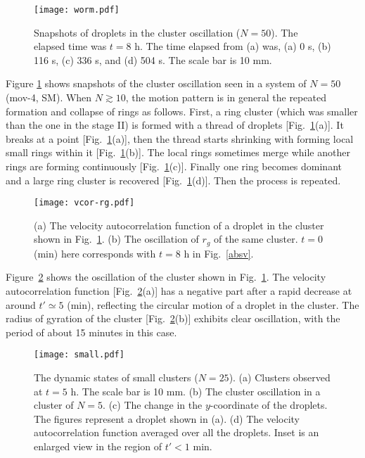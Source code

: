 \documentclass[showpacs]{revtex4-1}
\begin{document}
\begin{figure}
 \begin{center}
 \texttt{[image: worm.pdf]} \caption{Snapshots of
 droplets in the cluster oscillation ($N=50$). The elapsed time was
 $t=8$ h. The time elapsed from (a) was, (a) 0 s, (b) 116 s, (c) 336 s,
 and (d) 504 s. The scale bar is 10 mm.} \label{worm}  
 \end{center}
\end{figure}

Figure \ref{worm} shows snapshots of the cluster oscillation seen in a
system of $N=50$ (mov-4, SM). When $N\gtrsim 10$, the motion pattern
is in general the repeated formation and collapse of rings as
follows. First, a ring cluster (which was smaller than the one in the
stage II) is formed with a thread of droplets [Fig.~\ref{worm}(a)]. It
breaks at a point [Fig.~\ref{worm}(a)], then the thread starts shrinking
with forming local small rings within it [Fig.~\ref{worm}(b)]. The local
rings sometimes merge while another rings are forming continuously
[Fig.~\ref{worm}(c)]. Finally one ring becomes dominant and a
large ring cluster is recovered [Fig.~\ref{worm}(d)]. Then the
process is repeated.

\begin{figure}
 \begin{center}
 \texttt{[image: vcor-rg.pdf]} \caption{(a)
 The velocity autocorrelation function of a droplet in the cluster shown in
 Fig.~\ref{worm}. (b) The oscillation of $r_g$ of the same
 cluster. $t=0$ (min) here corresponds with $t=8$ h in Fig.~\ref{absv}.}
 \label{oscillation}  
 \end{center}
\end{figure}

Figure~\ref{oscillation} shows the oscillation of the cluster shown in
Fig.~\ref{worm}. The velocity autocorrelation function
[Fig.~\ref{oscillation}(a)] has a negative part after a rapid decrease
at around $t'\simeq 5$ (min), reflecting the circular motion of a droplet
in the cluster. The radius of gyration of the cluster
[Fig.~\ref{oscillation}(b)] exhibits clear oscillation, with the period
of about 15 minutes in this case. 

\begin{figure}
 \begin{center}
 \texttt{[image: small.pdf]}
 \caption{The dynamic states of small clusters ($N=25$). (a) Clusters
 observed at $t=5$ h. The scale bar is 10 mm. (b) The cluster
 oscillation in a cluster of $N=5$. (c) The change in the $y$-coordinate
 of the droplets. The figures represent a droplet shown in (a). (d) The
 velocity autocorrelation function averaged over all the droplets. Inset
 is an enlarged view in the region of $t'<1$ min.}  \label{small}  
 \end{center}
\end{figure}
\end{document}
